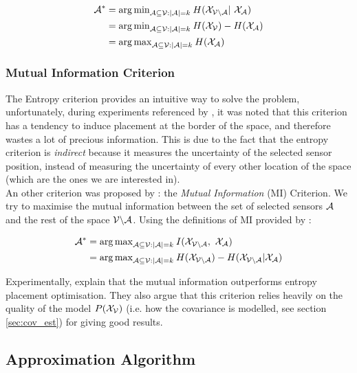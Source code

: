 \documentclass[12pt,twoside]{report}
\begin{document}
\begin{align}
	\A^* &= {\arg\min}_{\A \subseteq \V : |\A| = k } \: H(\X_{\VA} | \X_\A) \\
	 &= {\arg\min}_{\A \subseteq \V : |\A| = k }\:  H(\X_\V) -  H(\X_{\A}) \\
	 &= {\arg\max}_{\A \subseteq \V : |\A| = k }\:  H(\X_{\A}) 
\end{align}


\subsubsection{Mutual Information Criterion}

The Entropy criterion provides an intuitive way to solve the problem, unfortunately, during experiments referenced by \citet{krause_near-optimal_2008}, it was noted that this criterion has a tendency to induce placement at the border of the space, and therefore wastes a lot of precious information. This is due to the fact that the entropy criterion is \textit{indirect} because it measures the uncertainty of the selected sensor position, instead of measuring the uncertainty of every other location of the space (which are the ones we are interested in). \\

An other criterion was proposed by \citet{caselton_optimal_1984} : the \textit{Mutual Information} (MI) Criterion. We try to maximise the mutual information between the set of selected sensors $\mathcal{A}$ and the rest of the space $\mathcal{V} \backslash\mathcal{A}$. Using the definitions of MI provided by \citet[p.~19]{cover_elements_1991} : 

\begin{align}
	\A^* &= {\arg\max}_{\A \subseteq \V : |\A| = k } \: I(\X_{\VA} , \X_\A) \\
	&= {\arg\max}_{\A \subseteq \V : |\A| = k } \: H(\X_{\VA}) -  H(\X_{\VA} | \X_{\A})
\end{align}


Experimentally, \citet{krause_near-optimal_2008} explain that  the mutual information outperforms entropy placement optimisation. They also argue that this criterion relies heavily on the quality of the model $P(\mathcal{X}_{\mathcal{V}})$ (i.e. how the covariance is modelled, see section \ref{sec:cov_est}) for giving good results. 

\subsection{Approximation Algorithm}
 
\end{document}
